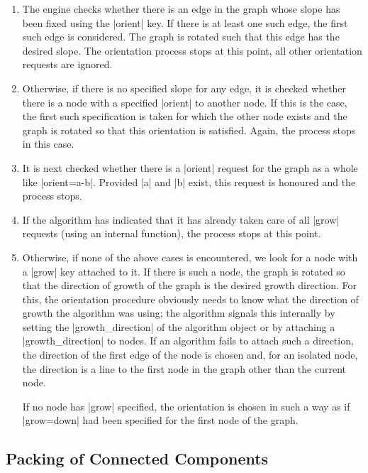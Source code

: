 {\begin{enumerate}
  Nevertheless, the following steps are always performed:
\item
  The engine checks whether there is an edge in the graph whose
  slope has been fixed using the |orient| key. If there is at least one
  such edge, the first such edge is considered. The graph is rotated
  such that this edge has the desired slope. The orientation process
  stops at this point, all other orientation requests are ignored.
\item
  Otherwise, if there is no specified slope for any edge, it is
  checked whether there is a node with a specified |orient| to another
  node. If this is the case, the first such specification is taken for
  which the other node exists and the graph is rotated so that this
  orientation is satisfied. Again, the process stops in this case.
\item
  It is next checked whether there is a |orient| request for the graph
  as a whole like |orient=a-b|. Provided |a| and |b| exist, this
  request is honoured and the process stops.
\item
  If the algorithm has indicated that it has already taken care of all
  |grow| requests (using an internal function), the process stops at
  this point.
\item
  Otherwise, if none of the above cases is encountered, we look for
  a node with a |grow| key attached to it. If there is such a node,
  the graph is rotated so that the direction of growth of the graph is
  the desired growth direction. For this, the orientation procedure
  obviously needs to know what the direction of growth the algorithm
  was using; the algorithm signals this internally by setting the
  |growth_direction| of the algorithm object or by attaching a
  |growth_direction| to nodes. If an algorithm fails to attach such a
  direction, the direction of the first edge of the node is chosen
  and, for an isolated node, the direction is a line to the first node
  in the graph other than the current node.
  
  If no node has |grow| specified, the orientation is chosen in such a
  way as if |grow=down| had been specified for the first node of the
  graph.   
\end{enumerate}



\subsection{Packing of Connected Components}

}
